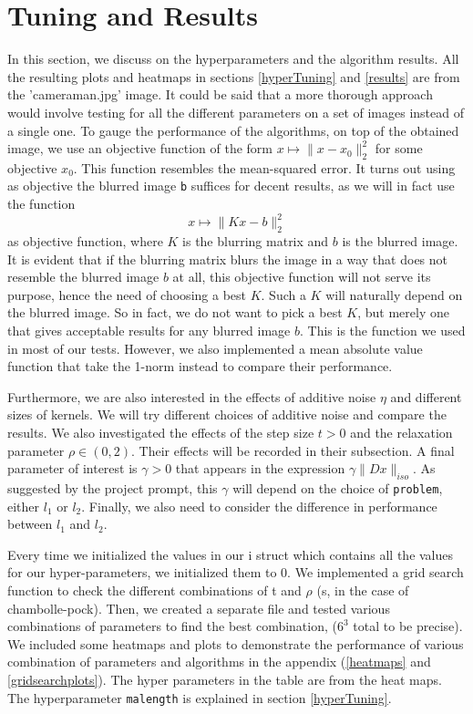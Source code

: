 \documentclass{article}
\theoremstyle{definition}
\theoremstyle{remark}
\begin{document}
\section{Tuning and Results}
In this section, we discuss on the hyperparameters and the algorithm results. All the resulting plots and heatmaps in sections \ref{hyperTuning} and \ref{results} are from the 'cameraman.jpg' image. It could be said that a more thorough approach would involve testing for all the different parameters on a set of images instead of a single one. To gauge the performance of the algorithms, on top of the obtained image, we use an objective function of the form $x \mapsto \| x - x_0 \|^2_2$ for some objective $x_0$. This function resembles the mean-squared error. It turns out using as objective the blurred image \texttt{b} suffices for decent results, as we will in fact use the function
$$
x \mapsto \| K x - b \|^2_2
$$
as objective function, where $K$ is the blurring matrix and $b$ is the blurred image. It is evident that if the blurring matrix blurs the image in a way that does not resemble the blurred image $b$ at all, this objective function will not serve its purpose, hence the need of choosing a best $K$. Such a $K$ will naturally depend on the blurred image. So in fact, we do not want to pick a best $K$, but merely one that gives acceptable results for any blurred image $b$. This is the function we used in most of our tests. However, we also implemented a mean absolute value function that take the 1-norm instead to compare their performance.

\medskip

Furthermore, we are also interested in the effects of  additive noise $\eta$ and different sizes of kernels. We will try different choices of additive noise and compare the results. We also investigated the effects of the step size $t > 0$ and the relaxation parameter $\rho \in (0, 2)$. Their effects will be recorded in their subsection. A final parameter of interest is $\gamma > 0$ that appears in the expression $\gamma \| D x \|_{iso}$. As suggested by the project prompt, this $\gamma$ will depend on the choice of \texttt{problem}, either $l_1$ or $l_2$. Finally, we also need to consider the difference in performance between $l_1$ and $l_2$. 
\medskip 

Every time we initialized the values in our i struct which contains all the values for our hyper-parameters, we initialized them to 0. We implemented a grid search function to check the different combinations of t and $\rho$ (s, in the case of chambolle-pock). Then, we created a separate file and tested various combinations of parameters to find the best combination, ($6^3$ total to be precise). We included some heatmaps and plots to demonstrate the performance of various combination of parameters and algorithms in the appendix (\ref{heatmaps} and \ref{gridsearchplots}). The hyper parameters in the table are from the heat maps. The hyperparameter \texttt{malength} is explained in section \ref{hyperTuning}.
\end{document}
